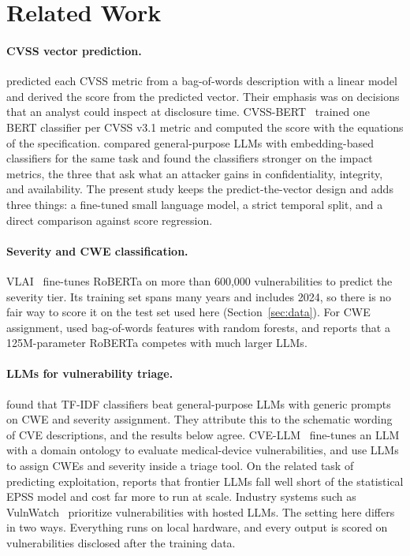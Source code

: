 \section{Related Work}

\paragraph{CVSS vector prediction.}
\citet{elbaz2020fighting} predicted each CVSS metric from a bag-of-words description with a linear model and derived the score from the predicted vector.
Their emphasis was on decisions that an analyst could inspect at disclosure time.
CVSS-BERT~\citep{shahid2021cvssbert} trained one BERT classifier per CVSS v3.1 metric and computed the score with the equations of the specification.
\citet{marchiori2025canllms} compared general-purpose LLMs with embedding-based classifiers for the same task and found the classifiers stronger on the impact metrics, the three that ask what an attacker gains in confidentiality, integrity, and availability.
The present study keeps the predict-the-vector design and adds three things: a fine-tuned small language model, a strict temporal split, and a direct comparison against score regression.

\paragraph{Severity and CWE classification.}
VLAI~\citep{bonhomme2025vlai} fine-tunes RoBERTa on more than 600,000 vulnerabilities to predict the severity tier.
Its training set spans many years and includes 2024, so there is no fair way to score it on the test set used here (Section~\ref{sec:data}).
For CWE assignment, \citet{aota2020automation} used bag-of-words features with random forests, and \citet{mosievskiy2026roberta} reports that a 125M-parameter RoBERTa competes with much larger LLMs.

\paragraph{LLMs for vulnerability triage.}
\citet{talibzade2025llms} found that TF-IDF classifiers beat general-purpose LLMs with generic prompts on CWE and severity assignment.
They attribute this to the schematic wording of CVE descriptions, and the results below agree.
CVE-LLM~\citep{ghosh2025cvellm} fine-tunes an LLM with a domain ontology to evaluate medical-device vulnerabilities, and \citet{torkamani2025casey} use LLMs to assign CWEs and severity inside a triage tool.
On the related task of predicting exploitation, \citet{roytman2025benchmarking} reports that frontier LLMs fall well short of the statistical EPSS model and cost far more to run at scale.
Industry systems such as VulnWatch~\citep{databricks2025vulnwatch} prioritize vulnerabilities with hosted LLMs.
The setting here differs in two ways.
Everything runs on local hardware, and every output is scored on vulnerabilities disclosed after the training data.
